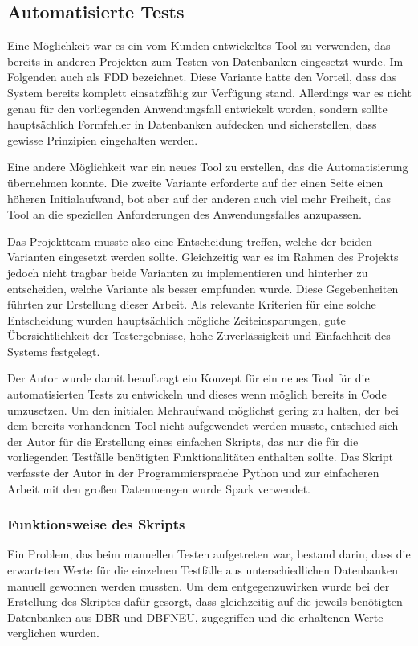 \subsection{Automatisierte Tests}

Eine Möglichkeit war es ein vom Kunden entwickeltes Tool zu verwenden, das bereits in anderen Projekten zum Testen von Datenbanken eingesetzt wurde. Im Folgenden auch als \ac{FDD} bezeichnet. Diese Variante hatte den Vorteil, dass das System bereits komplett einsatzfähig zur Verfügung stand. Allerdings war es nicht genau für den vorliegenden Anwendungsfall entwickelt worden, sondern sollte hauptsächlich Formfehler in Datenbanken aufdecken und sicherstellen, dass gewisse Prinzipien eingehalten werden. 
\newline


Eine andere Möglichkeit war ein neues Tool zu erstellen, das die Automatisierung übernehmen konnte.
Die zweite Variante erforderte auf der einen Seite einen höheren Initialaufwand, bot aber auf der anderen auch viel mehr Freiheit, das Tool an die speziellen Anforderungen des Anwendungsfalles anzupassen. 
\newline


Das Projektteam musste also eine Entscheidung treffen, welche der beiden Varianten eingesetzt werden sollte. Gleichzeitig war es im Rahmen des Projekts jedoch nicht tragbar beide Varianten zu implementieren und hinterher zu entscheiden, welche Variante als besser empfunden wurde. Diese Gegebenheiten führten zur Erstellung dieser Arbeit. Als relevante Kriterien für eine solche Entscheidung wurden hauptsächlich mögliche Zeiteinsparungen, gute Übersichtlichkeit der Testergebnisse, hohe Zuverlässigkeit und Einfachheit des Systems festgelegt.
\newline


Der Autor wurde damit beauftragt ein Konzept für ein neues Tool für die automatisierten Tests zu entwickeln und dieses wenn möglich bereits in Code umzusetzen. Um den initialen Mehraufwand möglichst gering zu halten, der bei dem bereits vorhandenen Tool nicht aufgewendet werden musste, entschied sich der Autor für die Erstellung eines einfachen Skripts, das nur die für die vorliegenden Testfälle benötigten Funktionalitäten enthalten sollte. Das Skript verfasste der Autor in der Programmiersprache Python und zur einfacheren Arbeit mit den großen Datenmengen wurde Spark verwendet.

\subsubsection{Funktionsweise des Skripts}
Ein Problem, das beim manuellen Testen aufgetreten war, bestand darin, dass die erwarteten Werte für die einzelnen Testfälle aus unterschiedlichen Datenbanken manuell gewonnen werden mussten. Um dem entgegenzuwirken wurde bei der Erstellung des Skriptes dafür gesorgt, dass gleichzeitig auf die jeweils benötigten Datenbanken aus \ac{DBR} und \ac{DBFNEU}, zugegriffen und die erhaltenen Werte verglichen wurden.
\newline



